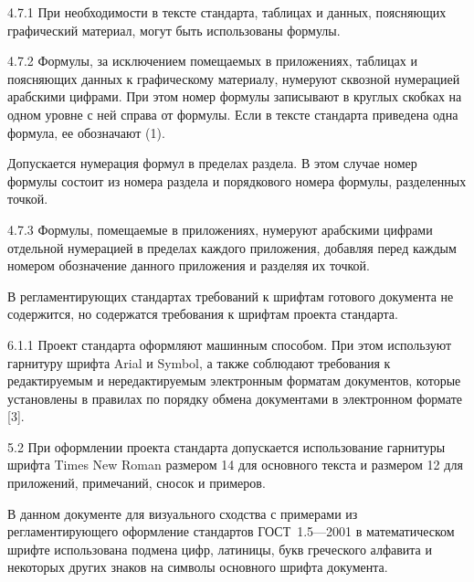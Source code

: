 \documentclass[12pt, twoside, final]{ruost}
\begin{document}
\begin{OST}
				\begin{stdquote}
					\par 4.7.1 При необходимости в тексте стандарта, таблицах и данных, поясняющих графический материал, могут быть использованы формулы.
					\par 4.7.2 Формулы, за исключением помещаемых в приложениях, таблицах и поясняющих данных к графическому материалу, нумеруют сквозной нумерацией арабскими цифрами. При этом номер формулы записывают в круглых скобках на одном уровне с ней справа от формулы. Если в тексте стандарта приведена одна формула, ее обозначают (1).
					\par Допускается нумерация формул в пределах раздела. В этом случае номер формулы состоит из номера раздела и порядкового номера формулы, разделенных точкой.
					\par 4.7.3 Формулы, помещаемые в приложениях, нумеруют арабскими цифрами отдельной нумерацией в пределах каждого приложения, добавляя перед каждым номером обозначение данного приложения и разделяя их точкой.
					\par [ГОСТ 1.5---2001]
				\end{stdquote}
				
				\point В регламентирующих стандартах требований к шрифтам готового документа не содержится, но содержатся требования к шрифтам проекта стандарта.				
				
				\begin{stdquote}
					\par 6.1.1 Проект стандарта оформляют машинным способом. При этом используют гарнитуру шрифта Arial и Symbol, а также соблюдают требования к редактируемым и нередактируемым электронным форматам документов, которые установлены в правилах по порядку обмена документами в электронном формате [3].
					\par [ГОСТ 1.5---2001]
				\end{stdquote}
				
				\begin{stdquote}
					\par 5.2 При оформлении проекта стандарта допускается использование гарнитуры шрифта Times New Roman размером 14 для основного текста и размером 12 для приложений, примечаний, сносок и примеров.
					\par [ГОСТ Р 1.5---2001]
				\end{stdquote}
				
				\point В данном документе для визуального сходства с примерами из регламентирующего оформление стандартов ГОСТ~1.5---2001 в математическом шрифте использована подмена цифр, латиницы, букв греческого алфавита и некоторых других знаков на символы основного шрифта документа.
			

\end{OST}
\end{document}
